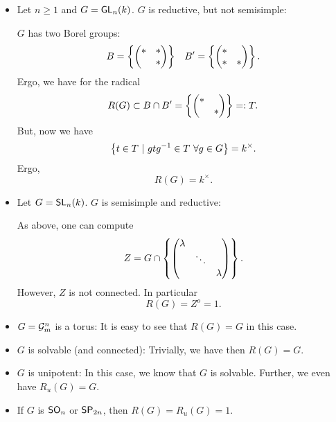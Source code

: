 \begin{example}
	\begin{itemize}
		\item Let $n \geq 1$ and $G = \textsf{GL}_n(k)$. $G$ is reductive, but not semisimple:
		
		$G$ has two Borel groups:
		\begin{align*}
		B = \left\lbrace\left(\begin{matrix} * & *\\ & * \end{matrix}\right)\right\rbrace && B' = \left\lbrace\left(\begin{matrix} * & \\ * & * \end{matrix}\right)\right\rbrace.
		\end{align*}
		Ergo, we have for the radical
		\[ R(G) \subset B \cap B' = \left\lbrace\left(\begin{matrix} * & \\ & * \end{matrix}\right)\right\rbrace =: T. \]
		But, now we have
		\[ \left\lbrace t \in T ~ | ~ gtg^{-1} \in T ~ \forall g \in G\right\rbrace = k^\times. \]
		Ergo,
		\[ R(G) =  k^\times. \]
		\item Let $G = \textsf{SL}_n(k)$. $G$ is semisimple and reductive:
		
		As above, one can compute
		\[ Z = G \cap \left\lbrace\left(\begin{matrix}  \lambda & & \\
				& \ddots & \\
				& & \lambda \end{matrix}\right)\right\rbrace. \]
		However, $Z$ is not connected. In particular
		\[ R(G) = Z^o = 1. \]
		\item $G = \mathcal{G}^n_m$ is a torus: It is easy to see that $R(G) = G$ in this case.
		\item $G$ is solvable (and connected): Trivially, we have then $R(G) = G$.
		\item $G$ is unipotent: In this case, we know that $G$ is solvable. Further, we even have $R_u(G) = G$.
		\item If $G$ is $\textsf{SO}_n$ or $\textsf{SP}_{2n}$, then $R(G) = R_u(G) = 1$.
	\end{itemize}
\end{example}